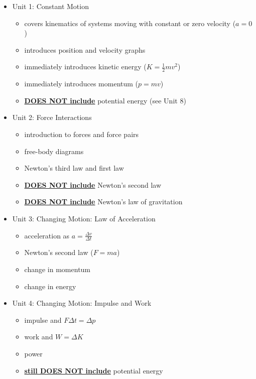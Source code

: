 \documentclass[12pt]{article}
\begin{document}
\begin{itemize}[itemsep=-2pt,topsep=-2pt]
    \item Unit 1: Constant Motion
    \begin{itemize}[itemsep=-2pt,topsep=-2pt]
        \item covers kinematics of systems moving with constant or zero velocity ($a = 0$)
        \item introduces position and velocity graphs
        \item immediately introduces kinetic energy ($K = \frac{1}{2} m v^2$)
        \item immediately introduces momentum ($p = mv$)
        \item \textbf{\underline{DOES NOT include}} potential energy (see Unit 8)
    \end{itemize}
    \item Unit 2: Force Interactions
    \begin{itemize}[itemsep=-2pt,topsep=-2pt]
        \item introduction to forces and force pairs
        \item free-body diagrams
        \item Newton's third law and first law
        \item \textbf{\underline{DOES NOT include}} Newton's second law
        \item \textbf{\underline{DOES NOT include}} Newton's law of gravitation
    \end{itemize}
    \item Unit 3: Changing Motion: Law of Acceleration
    \begin{itemize}[itemsep=-2pt,topsep=-2pt]
        \item acceleration as $a = \frac{\Delta v}{\Delta t}$
        \item Newton's second law ($F = ma$)
        \item change in momentum
        \item change in energy
    \end{itemize}
    \item Unit 4: Changing Motion: Impulse and Work
    \begin{itemize}[itemsep=-2pt,topsep=-2pt]
        \item impulse and $F \Delta t = \Delta p $
        \item work and $W = \Delta K$
        \item power
        \item \textbf{\underline{still DOES NOT include}} potential energy

\end{itemize}
\end{itemize}
\end{document}
